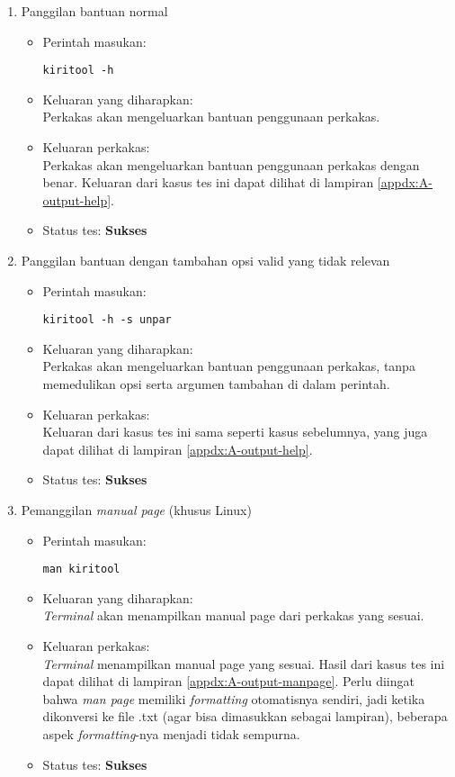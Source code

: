 \begin{enumerate}
	\item Panggilan bantuan normal
	\begin{itemize}
		\item Perintah masukan:
		\begin{verbatim}
kiritool -h
		\end{verbatim}
		\item Keluaran yang diharapkan: \\
		Perkakas akan mengeluarkan bantuan penggunaan perkakas.
		\item Keluaran perkakas: \\
		Perkakas akan mengeluarkan bantuan penggunaan perkakas dengan benar. Keluaran dari kasus tes ini dapat dilihat di lampiran \ref{appdx:A-output-help}.
		\item Status tes: \textbf{Sukses}
	\end{itemize}
	
	\item Panggilan bantuan dengan tambahan opsi valid yang tidak relevan
	\begin{itemize}
		\item Perintah masukan:
		\begin{verbatim}
kiritool -h -s unpar
		\end{verbatim}
		\item Keluaran yang diharapkan: \\
		Perkakas akan mengeluarkan bantuan penggunaan perkakas, tanpa memedulikan opsi serta argumen tambahan di dalam perintah.
		\item Keluaran perkakas: \\
		Keluaran dari kasus tes ini sama seperti kasus sebelumnya, yang juga dapat dilihat di lampiran \ref{appdx:A-output-help}.
		\item Status tes: \textbf{Sukses}
	\end{itemize}
	
	\item Pemanggilan \textit{manual page} (khusus Linux)
	\begin{itemize}
		\item Perintah masukan:
		\begin{verbatim}
man kiritool
		\end{verbatim}
		\item Keluaran yang diharapkan: \\
		\textit{Terminal} akan menampilkan manual page dari perkakas yang sesuai.
		\item Keluaran perkakas: \\
		\textit{Terminal} menampilkan manual page yang sesuai. Hasil dari kasus tes ini dapat dilihat di lampiran \ref{appdx:A-output-manpage}. Perlu diingat bahwa \textit{man page} memiliki \textit{formatting} otomatisnya sendiri, jadi ketika dikonversi ke file .txt (agar bisa dimasukkan sebagai lampiran), beberapa aspek \textit{formatting}-nya menjadi tidak sempurna.
		\item Status tes: \textbf{Sukses}
	\end{itemize}

\end{enumerate}

